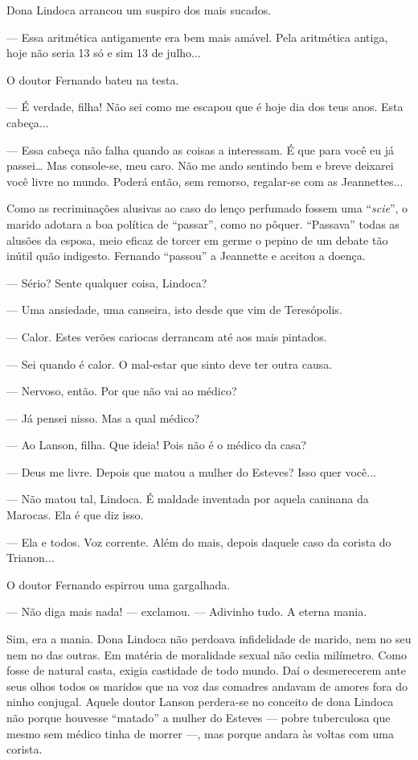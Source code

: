 Dona Lindoca arrancou um suspiro dos mais sucados.

--- Essa aritmética antigamente era bem mais amável. Pela aritmética
antiga, hoje não seria 13 só e sim 13 de julho...

O doutor Fernando bateu na testa.

--- É verdade, filha! Não sei como me escapou que é hoje dia dos teus
anos. Esta cabeça...

--- Essa cabeça não falha quando as coisas a interessam. É que para você
eu já passei\ldots{} Mas console-se, meu caro. Não me ando sentindo bem
e breve deixarei você livre no mundo. Poderá então, sem remorso,
regalar-se com as Jeannettes...

Como as recriminações alusivas ao caso do lenço perfumado fossem uma
``\emph{scie}'', o marido adotara a boa política de ``passar'', como no
pôquer. ``Passava'' todas as alusões da esposa, meio eficaz de torcer em
germe o pepino de um debate tão inútil quão indigesto. Fernando
``passou'' a Jeannette e aceitou a doença.

--- Sério? Sente qualquer coisa, Lindoca?

--- Uma ansiedade, uma canseira, isto desde que vim de Teresópolis.

--- Calor. Estes verões cariocas derrancam até aos mais pintados.

--- Sei quando é calor. O mal-estar que sinto deve ter outra causa.

--- Nervoso, então. Por que não vai ao médico?

--- Já pensei nisso. Mas a qual médico?

--- Ao Lanson, filha. Que ideia! Pois não é o médico da casa?

--- Deus me livre. Depois que matou a mulher do Esteves? Isso quer
você...

--- Não matou tal, Lindoca. É maldade inventada por aquela caninana da
Marocas. Ela é que diz isso.

--- Ela e todos. Voz corrente. Além do mais, depois daquele caso da
corista do Trianon...

O doutor Fernando espirrou uma gargalhada.

--- Não diga mais nada! --- exclamou. --- Adivinho tudo. A eterna mania.

Sim, era a mania. Dona Lindoca não perdoava infidelidade de marido, nem
no seu nem no das outras. Em matéria de moralidade sexual não cedia
milímetro. Como fosse de natural casta, exigia castidade de todo mundo.
Daí o desmerecerem ante seus olhos todos os maridos que na voz das
comadres andavam de amores fora do ninho conjugal. Aquele doutor Lanson
perdera-se no conceito de dona Lindoca não porque houvesse ``matado'' a
mulher do Esteves --- pobre tuberculosa que mesmo sem médico tinha de
morrer ---, mas porque andara às voltas com uma corista.

